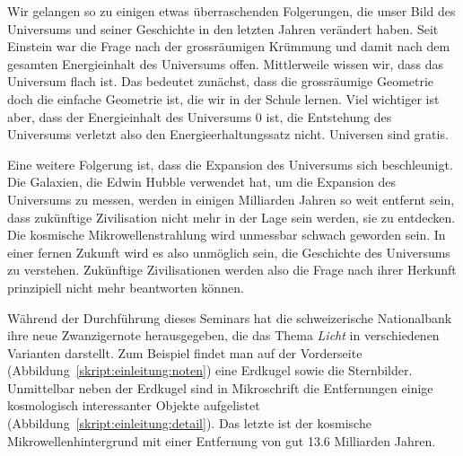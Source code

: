 Wir gelangen so zu einigen etwas überraschenden Folgerungen, die
unser Bild des Universums und seiner Geschichte in den letzten Jahren
verändert haben.
Seit Einstein war die Frage nach der grossräumigen Krümmung
und damit nach dem gesamten Energieinhalt des Universums offen.
Mittlerweile wissen wir, dass das Universum flach ist.
Das bedeutet zunächst, dass die grossräumige Geometrie doch die
einfache Geometrie ist, die wir in der Schule lernen.
Viel wichtiger ist aber, dass der Energieinhalt des Universums $0$ ist,
die Entstehung des Universums verletzt also den Energieerhaltungssatz nicht.
Universen sind gratis.

Eine weitere Folgerung ist, dass die Expansion des Universums sich
beschleunigt.
Die Galaxien, die Edwin Hubble verwendet hat, um die Expansion des
Universums zu messen, werden in einigen Milliarden Jahren so
weit entfernt sein, dass zukünftige Zivilisation nicht mehr in der
Lage sein werden, sie zu entdecken.
Die kosmische Mikrowellenstrahlung wird unmessbar schwach geworden sein.
In einer fernen Zukunft wird es also unmöglich sein, die Geschichte
des Universums zu verstehen.
Zukünftige Zivilisationen werden also die Frage nach ihrer Herkunft
prinzipiell nicht mehr beantworten können.

Während der Durchführung dieses Seminars hat die schweizerische
Nationalbank ihre neue Zwanzigernote herausgegeben, die das Thema
{\em Licht} in verschiedenen Varianten darstellt.
Zum Beispiel findet man auf der Vorderseite
(Abbildung~\ref{skript:einleitung:noten})
eine Erdkugel sowie die Sternbilder. 
Unmittelbar neben der Erdkugel sind in Mikroschrift die Entfernungen
einige kosmologisch interessanter Objekte aufgelistet
(Abbildung~\ref{skript:einleitung:detail}).
Das letzte ist der kosmische Mikrowellenhintergrund mit einer Entfernung
von gut 13.6 Milliarden Jahren.

